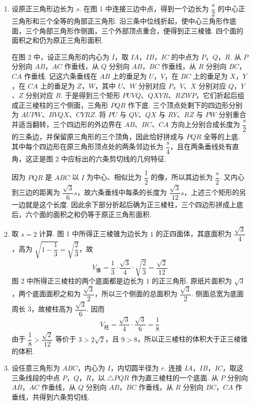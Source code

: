 \begin{solution}
\begin{enumerate}
    \item 设原正三角形边长为 \(s\). 在图 1 中连接三边中点，得到一个边长为 \(\dfrac{s}{2}\) 的中心正三角形和三个全等的角部正三角形. 沿三条中位线折起，使中心三角形作底面，三个角部三角形作侧面，三个外部顶点重合，便得到正三棱锥. 四个面的面积之和仍为原正三角形面积.

在图 2 中，设正三角形的内心为 \(I\)，取 \(IA\)，\(IB\)，\(IC\) 的中点为 \(P\)，\(Q\)，\(R\). 从 \(P\) 分别向 \(AB\)，\(AC\) 作垂线，从 \(Q\) 分别向 \(AB\)，\(BC\) 作垂线，从 \(R\) 分别向 \(BC\)，\(CA\) 作垂线. 记这六条垂线在 \(AB\) 上的垂足为 \(U\)，\(V\)，在 \(BC\) 上的垂足为 \(X\)，\(Y\)，在 \(CA\) 上的垂足为 \(Z\)，\(W\)，其中 \(U\)、\(W\) 分别对应 \(P\)，\(V\)、\(X\) 分别对应 \(Q\)，\(Y\)、\(Z\) 分别对应 \(R\). 于是得到三个矩形 \(PUVQ\)、\(QXYR\)、\(RZWP\)，它们折起后组成正三棱柱的三个侧面，三角形 \(PQR\) 作下底. 三个顶点处剩下的四边形分别为 \(AUPW\)、\(BVQX\)、\(CYRZ\). 将 \(PU\) 与 \(QV\)、\(QX\) 与 \(RY\)、\(RZ\) 与 \(PW\) 分别重合并适当翻转，三个四边形的外边界在 \(AB\)、\(BC\)、\(CA\) 方向上分别合成长度为 \(\dfrac{s}{2}\) 的三条边，并保留原三角形的三个顶角，因此恰好拼成与 \(PQR\) 全等的上底. 其中每个四边形在原三角形顶点处的两条邻边长为 \(\dfrac{s}{4}\)，且在两条垂线处有直角，这正是图 2 中应标出的六条剪切线的几何特征.

因为 \(PQR\) 是 \(ABC\) 以 \(I\) 为中心、相似比为 \(\dfrac12\) 的像，所以其边长为 \(\dfrac{s}{2}\). 又内心到三边的距离为 \(\dfrac{\sqrt3}{6}s\)，故六条垂线中每条的长度为 \(\dfrac{\sqrt3}{12}s\)，上述三个矩形的另一边就是这个长度. 因此余下部分折起后确为正三棱柱，三个四边形拼成上底后，六个面的面积之和仍等于原正三角形面积.

\item 取 \(s=2\) 计算. 图 1 中所得正三棱锥为边长为 \(1\) 的正四面体，其底面积为 \(\dfrac{\sqrt3}{4}\)，高为 \(\sqrt{1-\dfrac13}=\sqrt{\dfrac23}\)，故
\[
V_{\text{锥}}=\frac13\cdot\frac{\sqrt3}{4}\cdot\sqrt{\frac23}=\frac{\sqrt2}{12}
\]
图 2 中所得正三棱柱的两个底面都是边长为 \(1\) 的正三角形. 原纸片面积为 \(\sqrt3\)，两个底面面积之和为 \(\dfrac{\sqrt3}{2}\)，所以三个侧面的总面积为 \(\dfrac{\sqrt3}{2}\). 侧面总宽为底面周长 \(3\)，故棱柱高为 \(\dfrac{\sqrt3}{6}\). 因而
\[
V_{\text{柱}}=\frac{\sqrt3}{4}\cdot\frac{\sqrt3}{6}=\frac18
\]
由于 \(\dfrac18>\dfrac{\sqrt2}{12}\) 等价于 \(3>2\sqrt2\)，且 \(9>8\)，所以正三棱柱的体积大于正三棱锥的体积.

    \item 设任意三角形为 \(ABC\)，内心为 \(I\)，内切圆半径为 \(r\). 连接 \(IA\)，\(IB\)，\(IC\)，取这三条线段的中点 \(P\)，\(Q\)，\(R\)，以 \(\triangle PQR\) 作为直三棱柱的一个底面. 从 \(P\) 分别向 \(AB\)，\(AC\) 作垂线，从 \(Q\) 分别向 \(AB\)，\(BC\) 作垂线，从 \(R\) 分别向 \(BC\)，\(CA\) 作垂线，共得到六条剪切线.


\end{enumerate}
\end{solution}
